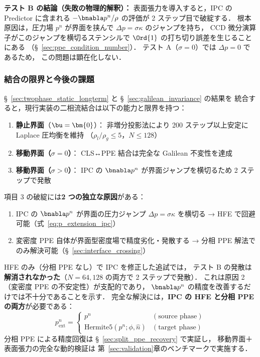 \noindent\textbf{テスト B の結論（失敗の物理的解釈）：}
表面張力を導入すると，IPC の Predictor に含まれる $-\bnabla p^n / \rho$
の評価が 2 ステップ目で破綻する．
根本原因は，圧力場 $p^n$ が界面を挟んで $\Delta p = \sigma\kappa$ のジャンプを持ち，
CCD 微分演算子がこのジャンプを横切るステンシルで
$\Ord{1}$ の打ち切り誤差を生じることにある
（§~\ref{sec:ppe_condition_number}）．
テスト A（$\sigma = 0$）では $\Delta p = 0$ であるため，
この問題は顕在化しない．

\subsubsection{結合の限界と今後の課題}
\label{sec:coupling_limitations}

§~\ref{sec:twophase_static_longterm} と §~\ref{sec:galilean_invariance} の結果を
統合すると，現行実装の二相流結合は以下の能力と限界を持つ：

\begin{enumerate}[noitemsep]
  \item \textbf{静止界面}（$\bu = \bm{0}$）：
        非増分投影法により 200 ステップ以上安定に Laplace 圧均衡を維持
        （$\rho_l/\rho_g \leq 5$，$N \leq 128$）
  \item \textbf{移動界面（$\sigma = 0$）}：
        CLS↔PPE 結合は完全な Galilean 不変性を達成
  \item \textbf{移動界面（$\sigma > 0$）}：
        IPC の $\bnabla p^n$ が界面ジャンプを横切るため 2 ステップで発散
\end{enumerate}

\noindent
項目 3 の破綻には\textbf{2 つの独立な原因}がある：
\begin{enumerate}[noitemsep]
  \item IPC の $\bnabla p^n$ が界面の圧力ジャンプ $\Delta p = \sigma\kappa$ を横切る
        → HFE で回避可能（式~\eqref{eq:p_extension_ipc}）
  \item 変密度 PPE 自体が界面型密度場で精度劣化・発散する
        → 分相 PPE 解法でのみ解決可能（§~\ref{sec:interface_crossing}）
\end{enumerate}

HFE のみ（分相 PPE なし）で IPC を修正した追試では，
テスト B の発散は\textbf{解消されなかった}（$N = 64, 128$ の両方で 2 ステップで発散）．
これは原因 2（変密度 PPE の不安定性）が支配的であり，
$\bnabla p^n$ の精度を改善するだけでは不十分であることを示す．
完全な解決には，\textbf{IPC の HFE と分相 PPE の両方}が必要である：
\begin{equation}
  p^n_{\text{ext}} = \begin{cases}
    p^n & (\text{source phase}) \\
    \text{Hermite5}(p^n; \phi, \hat{n}) & (\text{target phase})
  \end{cases}
  \label{eq:p_extension_ipc}
\end{equation}
分相 PPE による精度回復は §~\ref{sec:split_ppe_recovery} で実証し，
移動界面＋表面張力の完全な動的検証は
第~\ref{sec:validation}章のベンチマークで実施する．
